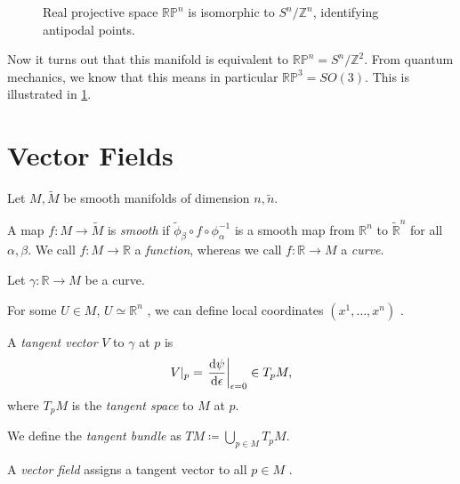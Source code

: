 \begin{figure}[tbhp]
  \centering
  \def\svgwidth{0.4\columnwidth}
  
  \caption{Real projective space $\mathbb{RP}^n$ is isomorphic to $S^n / \mathbb{Z}^n$, identifying antipodal points.}
  \label{fig:l2f1}
\end{figure}

Now it turns out that this manifold is equivalent to $\mathbb{RP}^n = S^n / \mathbb{Z}^2$. From quantum mechanics, we know that this means in particular $\mathbb{RP}^3 = SO(3)$.
This is illustrated in \ref{fig:l2f1}.

\chapter{Vector Fields}%
\label{cha:vector_fields}

Let $M, \widetilde{M}$ be smooth manifolds of dimension $n, \tilde{n}$.

\begin{definition}
  A map $f\colon M \to \widetilde{M}$ is \emph{smooth} if $\widetilde{\phi}_{\beta} \circ f \circ \phi_{\alpha}^{-1}$ is a smooth map from $\mathbb{R}^n$ to $\widetilde{\mathbb{R}}^n$ for all $\alpha, \beta$.
  We call $f \colon M \to \mathbb{R}$ a \emph{function}, whereas we call $f\colon \mathbb{R} \to M$ a \emph{curve}.
\end{definition} 

Let $\gamma\colon \mathbb{R} \to M$ be a curve.
\begin{figure}[tbhp]
  \centering
  \def\svgwidth{0.4\columnwidth}
  
  \caption{}
  \label{fig:l2f2}
\end{figure}
For some $U \in M$,  $U \simeq \mathbb{R}^n$ , we can define local coordinates $(x^1, \dots, x^n)$ .

\begin{definition}
  A \emph{tangent vector} $V$  to $\gamma$ at  $p$ is 
   \begin{equation}
     V\rvert_p = \left. \dv{\psi}{\epsilon}\right\rvert_{\epsilon = 0} \in T_p M,
  \end{equation}
  where $T_p M$ is the \emph{tangent space} to $M$ at $p$.
\end{definition}
\begin{definition}
  We define the \emph{tangent bundle} as $T M \coloneqq \bigcup_{p \in M} T_p M$.
\end{definition}
\begin{definition}
  A \emph{vector field} assigns a tangent vector to all $p \in M$ .
\end{definition}

